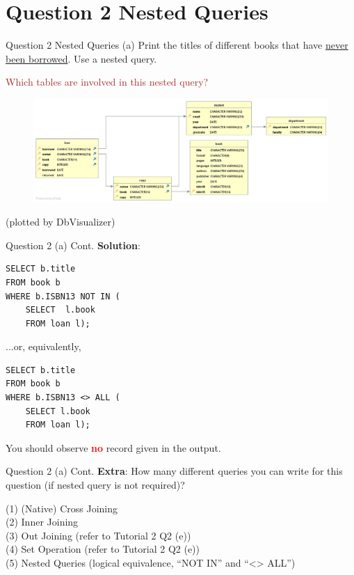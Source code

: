 \section*{Question 2 Nested Queries}

\begin{frame}[fragile]{Question 2 Nested Queries (a)}
Print the titles of different books that have \underline{never been borrowed}. Use a nested query.\\ \vspace{5pt}

\textcolor{brown}{Which tables are involved in this nested query?}
\begin{figure}
	\includegraphics[width=1\textwidth]{t1/images/t1-end.png}
\end{figure}\vspace{-10pt}
{\tiny(plotted by DbVisualizer)}
\end{frame}

\begin{frame}[fragile]{Question 2 (a) Cont.}
\textbf{Solution}:

\begin{lstlisting}
SELECT b.title 
FROM book b
WHERE b.ISBN13 NOT IN (
	SELECT  l.book 
	FROM loan l);
\end{lstlisting}\vspace{5pt}

...or, equivalently,

\begin{lstlisting}
SELECT b.title 
FROM book b
WHERE b.ISBN13 <> ALL (
	SELECT l.book 
	FROM loan l);
\end{lstlisting}\vspace{5pt}

You should observe \textcolor{red}{\textbf{no}} record given in the output. 
\end{frame}

\begin{frame}[fragile]{Question 2 (a) Cont.}
\textbf{Extra}: How many different queries you can write for this question (if nested query is not required)?\\ \vspace{10pt}

(1) (Native) Cross Joining\\
(2)	Inner Joining\\
(3) Out Joining (refer to Tutorial 2 Q2 (e))\\
(4) Set Operation (refer to Tutorial 2 Q2 (e))\\
(5) Nested Queries (logical equivalence, ``NOT IN'' and ``<> ALL'')
\end{frame}

